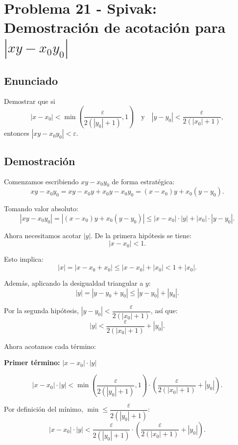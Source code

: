 
\section*{Problema 21 - Spivak: Demostración de acotación para $|xy - x_0y_0|$}

\subsection*{Enunciado}

Demostrar que si 
\[
|x - x_0| < \min\left(\frac{\varepsilon}{2(|y_0| + 1)}, 1\right) \quad \text{y} \quad |y - y_0| < \frac{\varepsilon}{2(|x_0| + 1)},
\]
entonces $|xy - x_0y_0| < \varepsilon$.

\subsection*{Demostración}

Comenzamos escribiendo $xy - x_0y_0$ de forma estratégica:
\[
xy - x_0y_0 = xy - x_0y + x_0y - x_0y_0 = (x - x_0)y + x_0(y - y_0).
\]

Tomando valor absoluto:
\[
|xy - x_0y_0| = |(x - x_0)y + x_0(y - y_0)| \leq |x - x_0| \cdot |y| + |x_0| \cdot |y - y_0|.
\]

Ahora necesitamos acotar $|y|$. De la primera hipótesis se tiene:
\[
|x - x_0| < 1.
\]

Esto implica:
\[
|x| = |x - x_0 + x_0| \leq |x - x_0| + |x_0| < 1 + |x_0|.
\]

Además, aplicando la desigualdad triangular a $y$:
\[
|y| = |y - y_0 + y_0| \leq |y - y_0| + |y_0|.
\]

Por la segunda hipótesis, $|y - y_0| < \dfrac{\varepsilon}{2(|x_0| + 1)}$, así que:
\[
|y| < \frac{\varepsilon}{2(|x_0| + 1)} + |y_0|.
\]

Ahora acotamos cada término:

\textbf{Primer término:} $|x - x_0| \cdot |y|$

\[
|x - x_0| \cdot |y| < \min\left(\frac{\varepsilon}{2(|y_0| + 1)}, 1\right) \cdot \left(\frac{\varepsilon}{2(|x_0| + 1)} + |y_0|\right).
\]

Por definición del mínimo, $\min \leq \dfrac{\varepsilon}{2(|y_0| + 1)}$:
\[
|x - x_0| \cdot |y| < \frac{\varepsilon}{2(|y_0| + 1)} \cdot \left(\frac{\varepsilon}{2(|x_0| + 1)} + |y_0|\right).
\]

